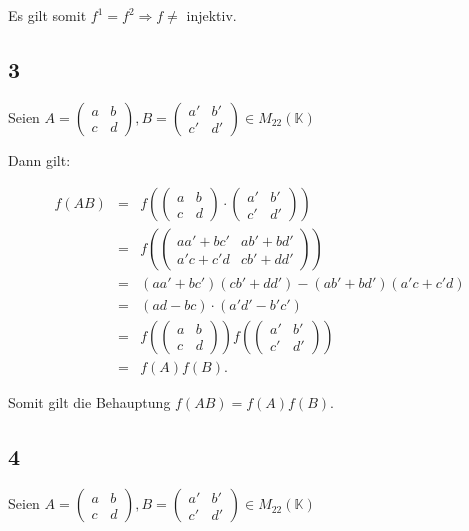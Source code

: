 \documentclass[12pt]{article}
\newcommand{\K}{\mathbb{K}}
\begin{document}
Es gilt somit $f^1 = f^2 \Rightarrow f \not=$ injektiv.

\subsection*{3}
Seien $A = \left( \begin{array}{ll} a & b \\ c & d   \end{array} \right), 
B = \left( \begin{array}{ll} a' & b' \\ c' & d'   \end{array} \right) \in M_{22}(\K)$

Dann gilt:

\begin{eqnarray*}
f(AB) &=& f( \left(  
    \begin{array}{ll} 
    a & b \\
    c & d   
    \end{array}\right)
    \cdot
    \left( 
    \begin{array}{ll} 
    a' & b' \\
    c' & d'  
    \end{array} \right)     
     )\\
    &=& f(
    \left( 
        \begin{array}{ll} 
        aa'+bc' & ab'+bd' \\
         a'c+c'd & cb'+dd'  
         \end{array} \right)  
     ) \\
     &=& (aa'+bc')(cb'+dd')-(ab'+bd')(a'c+c'd)\\
     &=&
     (ad - bc) \cdot (a'd' - b'c') \\
     &=&  f(
         \left(  
    \begin{array}{ll} a & b \\
     c & d   \end{array}\right) 
     )  f(
             \left( 
        \begin{array}{ll} 
        a' & b' \\
         c' & d'  
         \end{array} \right)     
     ) \\
     &=& f(A)f(B).
\end{eqnarray*}

Somit gilt die Behauptung $f(AB) = f(A)f(B).$

\subsection*{4}
Seien $A = \left( \begin{array}{ll} a & b \\ c & d   \end{array} \right), 
B = \left( \begin{array}{ll} a' & b' \\ c' & d'   \end{array} \right) \in M_{22}(\K)$
\end{document}
